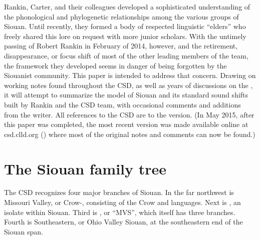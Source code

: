\documentclass[output=paper]{LSP/langsci}
\begin{document}
Rankin, Carter, and their colleagues developed a sophisticated understanding of the phonological and phylogenetic relationships among the various groups of Siouan.  Until recently, they formed a body of respected linguistic ``elders'' who freely shared this lore on request with more junior scholars.  With the untimely passing of Robert Rankin in February of 2014, however, and the retirement, disappearance, or focus shift of most of the other leading members of the team, the framework they developed seems in danger of being forgotten by the Siouanist community.  This paper is intended to address that concern.  Drawing on working notes found throughout the CSD, as well as years of discussions on the , it will attempt to summarize the model of Siouan  and its standard sound shifts built by Rankin and the CSD team, with occasional comments and additions from the writer.  All references to the CSD are to the \citeyear{Rankinetal2006PDF} version. (In May 2015, after this paper was completed, the most recent version was made available online at csd.clld.org (\citealt{Rankinetal2015AccessMay}) where most of the original notes and comments can now be found.)


\section{The Siouan family tree}

The CSD recognizes four major branches of Siouan. In the far northwest is Missouri Valley, or Crow-, consisting of the Crow and  languages. Next is , an isolate within Siouan. Third is , or ``MVS'', which itself has three branches. Fourth is Southeastern, or Ohio Valley Siouan, at the southeastern end of the Siouan span.
 
\end{document}
